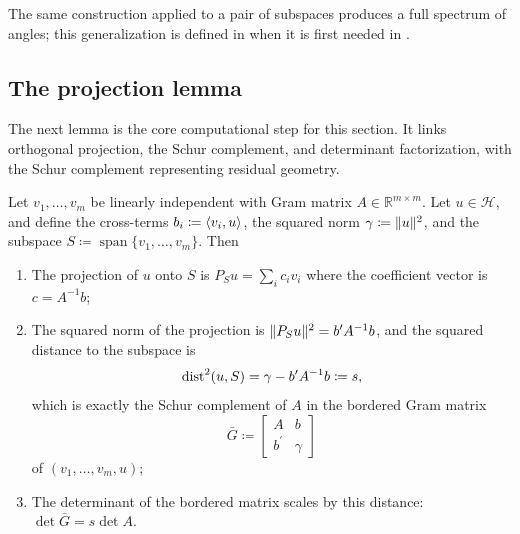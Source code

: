\documentclass{IEEEtran}
\begin{document}
The same construction applied to a pair of subspaces produces a full spectrum of angles; this generalization is defined in  when it is first needed in .

\subsection{The projection lemma}

The next lemma is the core computational step for this section. It links orthogonal projection, the Schur complement, and determinant factorization, with the Schur complement representing residual geometry.

\begin{lemma}
  \label{lem:projection}
  Let $v_{1}, \ldots, v_{m}$ be linearly independent with Gram matrix $A \in \mathbb{R}^{m \times m}$. Let $u \in \mathcal{H}$, and define the cross-terms $b_{i} \coloneq \langle v_{i}, u\rangle$, the squared norm $\gamma \coloneq \lVert u\rVert^{2}$, and the subspace $S \coloneq \operatorname{span}\{v_{1}, \ldots, v_{m}\}$. Then
  \begin{enumerate}[label=(\roman*)]
    \item\label{itm:projection} The projection of $u$ onto $S$ is $P_{S} u = \sum_{i} c_{i} v_{i}$ where the coefficient vector is $c = A^{-1} b$;
    \item\label{itm:projection-squared-norm} The squared norm of the projection is $\lVert P_{S} u\rVert^{2} = b^{\prime} A^{-1} b$, and the squared distance to the subspace is
      \begin{equation}
        \operatorname{dist}^{2}(u, S) = \gamma - b^{\prime} A^{-1} b \coloneq s ,
        \label{eq:schur-dist}
      \end{equation}
      which is exactly the Schur complement of $A$ in the bordered Gram matrix
      \[
        \bar{G} \coloneq
        \begin{bmatrix}
          A & b \\
          b^{\prime} & \gamma
        \end{bmatrix}
      \]
      of $(v_{1}, \ldots, v_{m}, u)$;
    \item\label{itm:projection-determinant} The determinant of the bordered matrix scales by this distance: $\det \bar{G} = s \det A$.
  \end{enumerate}
\end{lemma}
\end{document}
